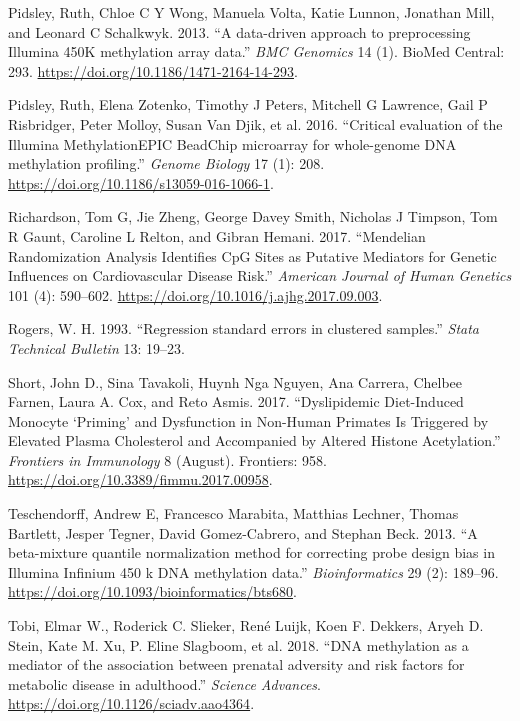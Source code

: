 \documentclass[]{article}
\begin{document}
\leavevmode\hypertarget{ref-Pidsley2013}{}%
Pidsley, Ruth, Chloe C Y Wong, Manuela Volta, Katie Lunnon, Jonathan
Mill, and Leonard C Schalkwyk. 2013. ``A data-driven approach to
preprocessing Illumina 450K methylation array data.'' \emph{BMC
Genomics} 14 (1). BioMed Central: 293.
\url{https://doi.org/10.1186/1471-2164-14-293}.

\leavevmode\hypertarget{ref-Pidsley2016}{}%
Pidsley, Ruth, Elena Zotenko, Timothy J Peters, Mitchell G Lawrence,
Gail P Risbridger, Peter Molloy, Susan Van Djik, et al. 2016. ``Critical
evaluation of the Illumina MethylationEPIC BeadChip microarray for
whole-genome DNA methylation profiling.'' \emph{Genome Biology} 17 (1):
208. \url{https://doi.org/10.1186/s13059-016-1066-1}.

\leavevmode\hypertarget{ref-Richardson2017}{}%
Richardson, Tom G, Jie Zheng, George Davey Smith, Nicholas J Timpson,
Tom R Gaunt, Caroline L Relton, and Gibran Hemani. 2017. ``Mendelian
Randomization Analysis Identifies CpG Sites as Putative Mediators for
Genetic Influences on Cardiovascular Disease Risk.'' \emph{American
Journal of Human Genetics} 101 (4): 590--602.
\url{https://doi.org/10.1016/j.ajhg.2017.09.003}.

\leavevmode\hypertarget{ref-Rogers1993}{}%
Rogers, W. H. 1993. ``Regression standard errors in clustered samples.''
\emph{Stata Technical Bulletin} 13: 19--23.

\leavevmode\hypertarget{ref-Short2017}{}%
Short, John D., Sina Tavakoli, Huynh Nga Nguyen, Ana Carrera, Chelbee
Farnen, Laura A. Cox, and Reto Asmis. 2017. ``Dyslipidemic Diet-Induced
Monocyte `Priming' and Dysfunction in Non-Human Primates Is Triggered by
Elevated Plasma Cholesterol and Accompanied by Altered Histone
Acetylation.'' \emph{Frontiers in Immunology} 8 (August). Frontiers:
958. \url{https://doi.org/10.3389/fimmu.2017.00958}.

\leavevmode\hypertarget{ref-Teschendorff2013}{}%
Teschendorff, Andrew E, Francesco Marabita, Matthias Lechner, Thomas
Bartlett, Jesper Tegner, David Gomez-Cabrero, and Stephan Beck. 2013.
``A beta-mixture quantile normalization method for correcting probe
design bias in Illumina Infinium 450 k DNA methylation data.''
\emph{Bioinformatics} 29 (2): 189--96.
\url{https://doi.org/10.1093/bioinformatics/bts680}.

\leavevmode\hypertarget{ref-Tobi2018}{}%
Tobi, Elmar W., Roderick C. Slieker, René Luijk, Koen F. Dekkers, Aryeh
D. Stein, Kate M. Xu, P. Eline Slagboom, et al. 2018. ``DNA methylation
as a mediator of the association between prenatal adversity and risk
factors for metabolic disease in adulthood.'' \emph{Science Advances}.
\url{https://doi.org/10.1126/sciadv.aao4364}.
\end{document}
